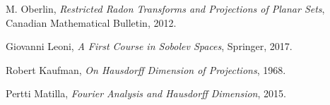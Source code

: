 \documentclass{article}
\theoremstyle{plain}
\theoremstyle{remark}
\theoremstyle{definition}
\begin{document}
\begin{thebibliography}{9}

    M. Oberlin,
    \emph{Restricted Radon Transforms and Projections of Planar Sets},
    Canadian Mathematical Bulletin,
    2012.

    Giovanni Leoni,
    \emph{A First Course in Sobolev Spaces},
    Springer,
    2017.

	Robert Kaufman,
	\emph{On Hausdorff Dimension of Projections},
	1968.

	Pertti Matilla,
	\emph{Fourier Analysis and Hausdorff Dimension},
	2015.

\end{thebibliography}
\end{document}
